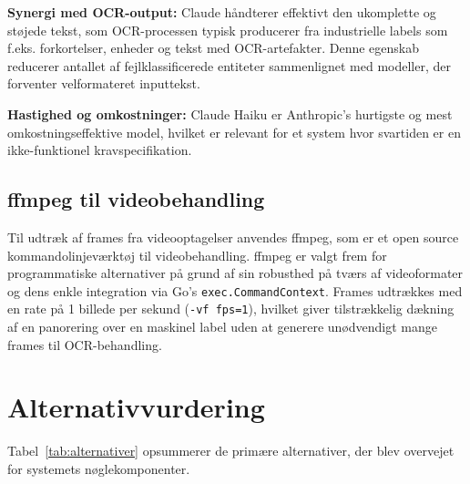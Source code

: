 \textbf{Synergi med OCR-output:} Claude håndterer effektivt den ukomplette og støjede tekst, som OCR-processen typisk producerer fra industrielle labels som f.eks. forkortelser, enheder og tekst med OCR-artefakter. Denne egenskab reducerer antallet af fejlklassificerede entiteter sammenlignet med modeller, der forventer velformateret inputtekst.

\textbf{Hastighed og omkostninger:} Claude Haiku er Anthropic's hurtigste og mest omkostningseffektive model, hvilket er relevant for et system hvor svartiden er en ikke-funktionel kravspecifikation.

\subsection{ffmpeg til videobehandling}
\label{subsec:ffmpeg}

Til udtræk af frames fra videooptagelser anvendes ffmpeg, som er et open source kommandolinjeværktøj til videobehandling. ffmpeg er valgt frem for programmatiske alternativer på grund af sin robusthed på tværs af videoformater og dens enkle integration via Go's \texttt{exec.CommandContext}. Frames udtrækkes med en rate på 1 billede per sekund (\texttt{-vf fps=1}), hvilket giver tilstrækkelig dækning af en panorering over en maskinel label uden at generere unødvendigt mange frames til OCR-behandling.

\section{Alternativvurdering}
\label{sec:alternativvurdering}

Tabel~\ref{tab:alternativer} opsummerer de primære alternativer, der blev overvejet for systemets nøglekomponenter.

